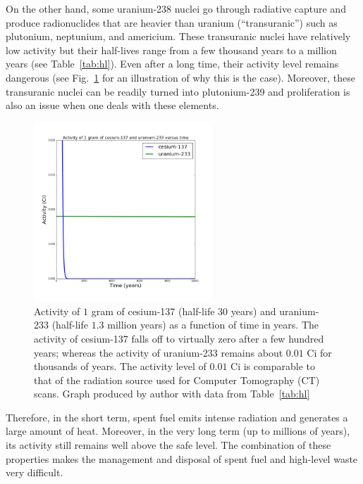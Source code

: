 \documentclass[nofootinbib,preprint,aps]{revtex4-1}
\begin{document}
        On the other hand, some uranium-238 nuclei go through radiative capture
        and produce radionuclides that are
        heavier than uranium (``transuranic'') such as plutonium, neptunium, and americium.
        These transuranic nuclei have relatively low activity but their half-lives range from a few thousand years
        to a million years (see Table~\ref{tab:hl}).
        Even after a long time, their activity level remains dangerous (see Fig.~\ref{fig:csru} for
        an illustration of why this is the case).
        Moreover, these transuranic nuclei can be readily turned into plutonium-239 and proliferation is also
        an issue when one deals with these elements.
        \begin{figure}
            \centering
            \includegraphics[width=0.6\textwidth]{csur.png}
            \caption{Activity of $1$ gram of cesium-137 (half-life $30$ years) and uranium-233 (half-life $1.3$ million
            years) as a function of time in years. The activity of cesium-137 falls off to virtually zero after a few
        hundred years; whereas the activity of uranium-233 remains about $0.01$ Ci for thousands of years. The activity
    level of $0.01$ Ci is comparable to that of the radiation source used for Computer Tomography (CT) scans.
    Graph produced by author with data from Table~\ref{tab:hl}}
            \label{fig:csru}
        \end{figure}
        Therefore, in the short term, spent fuel emits intense radiation and generates a large amount of heat.
        Moreover, in the very long term (up to millions of years), its activity still remains well above the safe level.
        The combination of these properties makes the management and disposal of spent fuel and high-level waste
        very difficult.
\end{document}
